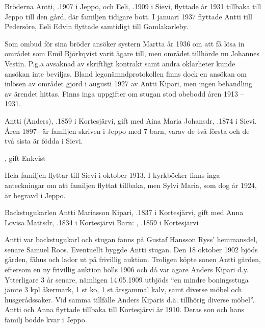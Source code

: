 
Bröderna Antti, .1907 i Jeppo, och Eeli, .1909 i Sievi, flyttade år 1931 tillbaka till Jeppo till den gård, där familjen tidigare bott. I januari 1937 flyttade Antti till Pedersöre, Eeli Edvin flyttade 			samtidigt till Gamlakarleby.

Som ombud för sina bröder ansöker systern Martta år 1936 om att få lösa in området som Emil Björkqvist varit ägare till, men området tillhörde nu Johannes Vestin. P.g.a avsaknad av skriftligt kontrakt samt andra oklarheter kunde ansökan inte beviljas. Bland legonämndprotokollen finns dock en ansökan om inlösen av området gjord i augusti 1927 av Antti Kipari, men ingen behandling av ärendet hittas.
Finns inga uppgifter om stugan stod obebodd åren 1913 – 1931.


Antti (Anders), .1859 i Kortesjärvi, gift med Aina Maria Johansdr, .1874 i Sievi. Åren 1897-- är familjen skriven i Jeppo med 7 barn, varav de två första och de två sista är födda i Sievi.
\begin{jhchildren}
  \item {}
  \item {}, gift Enkvist
  \item {}
  \item {}
  \item {}
  \item {}
  \item {}
\end{jhchildren}
Hela familjen flyttar till Sievi i oktober 1913. I kyrkböcker finns inga anteckningar om att familjen flyttat tillbaka, men Sylvi Maria, som dog år 1924, är begravd i Jeppo.


Backstugukarlen Antti Mariasson Kipari, .1837 i Kortesjärvi, gift med Anna Lovisa Mattsdr, .1834 i Kortesjärvi
Barn: , .1859 i Kortesjärvi

Antti var backstugukarl och stugan fanns på Gustaf Hansson Ryss' hemmansdel, senare Samuel Roos. Eventuellt byggde Antti stugan. Den 18 oktober 1902 bjöds gården, fähus och lador ut på frivillig auktion. Troligen köpte sonen Antti gården, eftersom en ny frivillig auktion hölls 1906 och då var ägare Anders Kipari d.y. Ytterligare 3 år senare, nämligen 14.05.1909 utbjöds ``en mindre boningsstuga jämte 3 kpl åkermark, 1 st ko, 1 st årsgammal kalv, samt diverse möbel och husgerådssaker. Vid samma tillfälle Anders Kiparis d.ä. tillhörig diverse möbel''. Antti och Anna flyttade tillbaka till Kortesjärvi år 1910. Deras son och hans familj bodde kvar i Jeppo.



